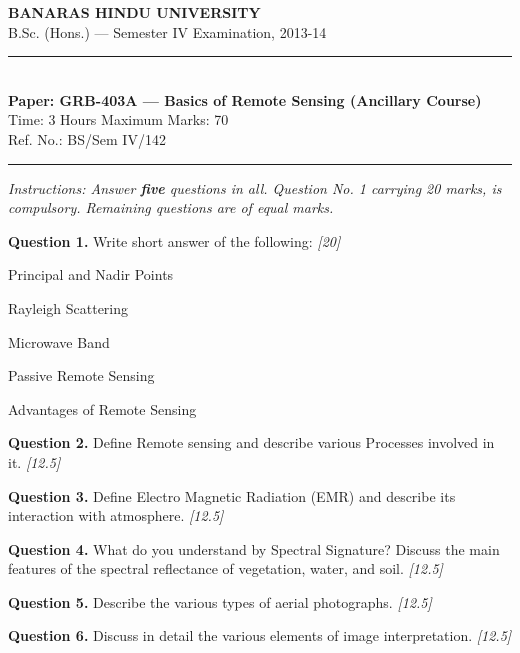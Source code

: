 \documentclass[11pt,a4paper]{article}
\newcommand{\pts}[1]{\hfill   \textit{[#1]}}
\begin{document}
\begin{center}
  {\large\bfseries BANARAS HINDU UNIVERSITY}\\[2pt]
  {\normalsize B.Sc. (Hons.) --- Semester IV Examination, 2013-14}\\[6pt]
  \rule{0.8\linewidth}{0.5pt}\\[6pt]
  {\large\bfseries Paper: GRB-403A --- Basics of Remote Sensing (Ancillary Course)}\\[4pt]
  {\normalsize Time: 3 Hours \hfill Maximum Marks: 70}\\[2pt]
  {\small Ref. No.: BS/Sem IV/142}
\end{center}
\rule{\linewidth}{0.4pt}
\smallskip



\noindent   \textit{Instructions: Answer   \textbf{five} questions in all. Question No. 1 carrying 20 marks, is compulsory. Remaining questions are of equal marks.}
\bigskip




\noindent   \textbf{Question 1.} Write short answer of the following: \pts{20}

\begin{parts}
  \item Principal and Nadir Points
  \item Rayleigh Scattering
  \item Microwave Band
  \item Passive Remote Sensing
  \item Advantages of Remote Sensing
\end{parts}

\medskip


\noindent   \textbf{Question 2.} Define Remote sensing and describe various Processes involved in it. \pts{12.5}

\medskip


\noindent   \textbf{Question 3.} Define Electro Magnetic Radiation (EMR) and describe its interaction with atmosphere. \pts{12.5}

\medskip


\noindent   \textbf{Question 4.} What do you understand by Spectral Signature? Discuss the main features of the spectral reflectance of vegetation, water, and soil. \pts{12.5}

\medskip


\noindent   \textbf{Question 5.} Describe the various types of aerial photographs. \pts{12.5}

\medskip


\noindent   \textbf{Question 6.} Discuss in detail the various elements of image interpretation. \pts{12.5}
\end{document}

